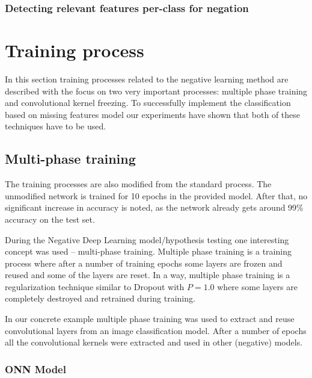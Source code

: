 \documentclass[b5paper]{book}
\begin{document}
\subsubsection{Detecting relevant features per-class for negation}

\section{Training process}

In this section training processes related to the negative learning method are described with the focus on two very important processes: multiple phase training and convolutional kernel freezing. To successfully implement the classification based on missing features model our experiments have shown that both of these techniques have to be used.

\subsection{Multi-phase training}

The training processes are also modified from the standard process. The unmodified network is trained for 10 epochs in the provided model. After that, no significant increase in accuracy is noted, as the network already gets around 99\% accuracy on the test set.

During the Negative Deep Learning model/hypothesis testing one interesting concept was used -- multi-phase training. Multiple phase training is a training process where after a number of training epochs some layers are frozen and reused and some of the layers are reset. In a way, multiple phase training is a regularization technique similar to Dropout with \(P = 1.0\) where some layers are completely destroyed and retrained during training. 

In our concrete example multiple phase training was used to extract and reuse convolutional layers from an image classification model. After a number of epochs all the convolutional kernels were extracted and used in other (negative) models.

\subsubsection{ONN Model}
\end{document}
